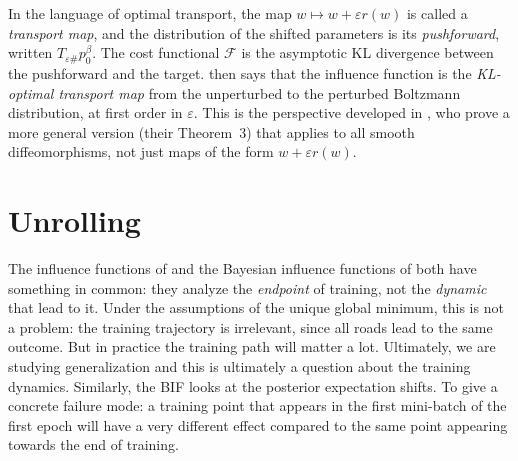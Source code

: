 \documentclass[11pt]{article}
\begin{document}
\begin{remark}\label{rem:optimal-transport}
In the language of optimal transport, the map $w\mapsto w+\varepsilon r(w)$ is called a \emph{transport map}, and the distribution of the shifted parameters is its \emph{pushforward}, written $T_{\varepsilon\#}p_0^\beta$. The cost functional $\mathcal{F}$ is the asymptotic KL divergence between the pushforward and the target.  then says that the influence function is the \emph{KL-optimal transport map} from the unperturbed to the perturbed Boltzmann distribution, at first order in $\varepsilon$. This is the perspective developed in \citet{mlodozeniec2025distributional}, who prove a more general version (their Theorem~3) that applies to all smooth diffeomorphisms, not just maps of the form $w+\varepsilon r(w)$.
\end{remark}

\section{Unrolling}\label{sec:unrolling}

The influence functions of  and the Bayesian influence functions of  both have something in common: they analyze the \emph{endpoint} of training, not the \emph{dynamic} that lead to it. Under the assumptions of the unique global minimum, this is not a problem: the training trajectory is irrelevant, since all roads lead to the same outcome. But in practice the training path will matter a lot. Ultimately, we are studying generalization and this is ultimately a question about the training dynamics. Similarly, the BIF looks at the posterior expectation shifts. To give a concrete failure mode: a training point that appears in the first mini-batch of the first epoch will have a very different effect compared to the same point appearing towards the end of training.
\end{document}
